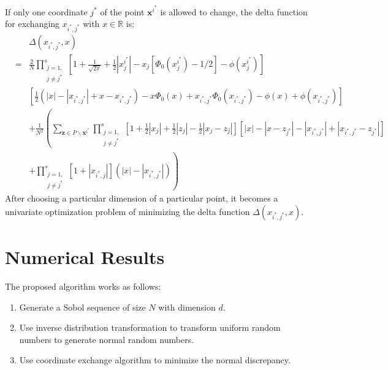 \documentclass[12pt]{article}
\newcommand{\vx}{\boldsymbol{x}}
\newcommand{\vz}{\boldsymbol{z}}
\begin{document}
If only one coordinate $j^*$ of the point $\vx^{i^*}$ is allowed to change, the delta function for exchanging $x_{{i^*},{j^*}}$ with $x\in \mathbb{R}$ is:
\begin{eqnarray*}
&&\Delta(x_{{i^*},{j^*}}, x)\\
&=& \frac{2}{N}\prod\limits_{\substack{j=1,\\j\neq j^*}}^s\left[ 1+\frac{1}{\sqrt{2\pi}}+\frac{1}{2}|x^{i^*}_{j}|-x_j[\Phi_0(x^{i^*}_{j})-1/2]-\phi(x^{i^*}_{j})\right]\\
&&\left[\frac{1}{2}\left(|x|-|x_{{i^*},{j^*}}|+x-x_{{i^*},{j^*}}\right)-x\Phi_0(x)+x_{{i^*},{j^*}}\Phi_0(x_{{i^*},{j^*}})-\phi(x)+\phi(x_{{i^*},{j^*}})\right]\\
&&+\frac{1}{N^2}\left(\sum_{\vz\in P\backslash \vx^{i^*}}\prod_{\substack{j=1,\\j\neq j^*}}^s\left[1+\frac{1}{2}|x_{j}|+\frac{1}{2}|z_j|-\frac{1}{2}|x_{j}-z_j|\right]\left[|x|-|x-z_{j^*}|-|x_{i^*,j^*}|+|x_{i^*,j^*}-z_{j^*}|\right]\right.\\
&&+\left.\prod_{\substack{j=1,\\j\neq j^*}}^s[1+|x_{i^*,j}|](|x|-|x_{i^*,j^*}|)\right)
\end{eqnarray*}
After choosing a particular dimension of a particular point, it becomes a univariate optimization problem of minimizing the delta function $\Delta(x_{{i^*},{j^*}}, x)$.
\newpage
\section{Numerical Results}
The proposed algorithm works as follows:
\begin{enumerate}
    \item 
    Generate a Sobol sequence of size $N$ with dimension $d$.
    \item
    Use inverse distribution transformation to transform uniform random numbers to generate normal random numbers.
    \item
    Use coordinate exchange algorithm to minimize the normal discrepancy.
\end{enumerate}
\end{document}
